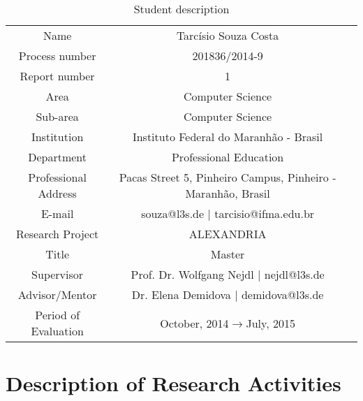 \documentclass[a4paper,11pt]{report}
\begin{document}
\begin{table} [!htb]
\begin{center}
\begin{tabular}{|l|l|l}
\cline{1-2}
\multicolumn{1}{|c|}{Name} & \multicolumn{1}{c|}{Tarcísio Souza Costa} &  \\ 
\cline{1-2}
\multicolumn{1}{|c|}{Process number} & \multicolumn{1}{c|}{201836/2014-9} &  \\ 
\cline{1-2}
\multicolumn{1}{|c|}{Report number} & \multicolumn{1}{c|}{1} &  \\
\cline{1-2}
\multicolumn{1}{|c|}{Area} & \multicolumn{1}{c|}{Computer Science} &  \\ 
\cline{1-2}
\multicolumn{1}{|c|}{Sub-area} & \multicolumn{1}{c|}{Computer Science} &  \\ 
\cline{1-2}
\multicolumn{1}{|c|}{Institution} & \multicolumn{1}{c|}{Instituto Federal do
Maranhão - Brasil} & \\
\cline{1-2}
\multicolumn{1}{|c|}{Department} & \multicolumn{1}{c|}{Professional Education} &\\
\cline{1-2}
\multicolumn{1}{|c|}{Professional Address} & \multicolumn{1}{c|}{
Pacas Street 5, Pinheiro Campus, Pinheiro - Maranhão, Brasil} &
\\
\cline{1-2}
\multicolumn{1}{|c|}{E-mail} &
\multicolumn{1}{c|}{souza@l3s.de | tarcisio@ifma.edu.br} &\\
\cline{1-2}
\multicolumn{1}{|c|}{Research Project} &
\multicolumn{1}{c|}{ALEXANDRIA}
&
\\
\cline{1-2}
\multicolumn{1}{|c|}{Title} & \multicolumn{1}{|c|}{Master} \\
\cline{1-2}
\multicolumn{1}{|c|}{Supervisor} & \multicolumn{1}{|c|}{Prof. Dr. Wolfgang
Nejdl | nejdl@l3s.de} \\
\cline{1-2}
\multicolumn{1}{|c|}{Advisor/Mentor} & \multicolumn{1}{|c|}{Dr. Elena Demidova
| demidova@l3s.de}

\\
\cline{1-2}
\multicolumn{1}{|c|}{Period of Evaluation} &
 \multicolumn{1}{c|}{October, 2014$\rightarrow$July, 2015} \\
\cline{1-2}
\end{tabular}

\caption{Student description}
\end{center}
\label{tab:work}
\end{table}


\chapter{Description of Research Activities}
\end{document}
